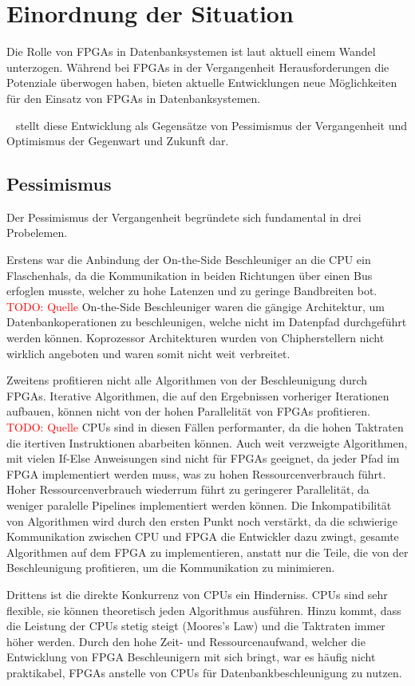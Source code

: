\documentclass[conference]{IEEEtran}
\newcommand{\todo}[1]{\textcolor{red}{TODO: #1}}
\begin{document}
\section{Einordnung der Situation}
Die Rolle von FPGAs in Datenbanksystemen ist laut \cite{istvan_glass_2019} aktuell einem Wandel unterzogen. Während bei FPGAs in der Vergangenheit
Herausforderungen die Potenziale überwogen haben, bieten aktuelle Entwicklungen neue Möglichkeiten für den Einsatz von FPGAs in Datenbanksystemen.

~\cite{istvan_glass_2019} stellt diese Entwicklung als Gegensätze von Pessimismus der Vergangenheit und Optimismus der Gegenwart und Zukunft dar.

\subsection{Pessimismus}
Der Pessimismus der Vergangenheit begründete sich fundamental in drei Probelemen.

Erstens war die Anbindung der On-the-Side Beschleuniger an die CPU ein Flaschenhals, da die Kommunikation in beiden Richtungen über
einen Bus erfoglen musste, welcher zu hohe Latenzen und zu geringe Bandbreiten bot. \todo{Quelle} On-the-Side Beschleuniger waren
die gängige Architektur, um Datenbankoperationen zu beschleunigen, welche nicht im Datenpfad durchgeführt werden können.
Koprozessor Architekturen wurden von Chipherstellern nicht wirklich angeboten und waren somit nicht weit verbreitet.

Zweitens profitieren nicht alle Algorithmen von der Beschleunigung durch FPGAs. Iterative Algorithmen, die auf den Ergebnissen vorheriger
Iterationen aufbauen, können nicht von der hohen Parallelität von FPGAs profitieren. \todo{Quelle} CPUs sind in diesen Fällen performanter,
da die hohen Taktraten die itertiven Instruktionen abarbeiten können. Auch weit verzweigte Algorithmen, mit vielen If-Else Anweisungen
sind nicht für FPGAs geeignet, da jeder Pfad im FPGA implementiert werden muss, was zu hohen Ressourcenverbrauch führt. Hoher Ressourcenverbrauch
wiederrum führt zu geringerer Parallelität, da weniger paralelle Pipelines implementiert werden können. Die Inkompatibilität von Algorithmen
wird durch den ersten Punkt noch verstärkt, da die schwierige Kommunikation zwischen CPU und FPGA die Entwickler dazu zwingt, gesamte Algorithmen
auf dem FPGA zu implementieren, anstatt nur die Teile, die von der Beschleunigung profitieren, um die Kommunikation zu minimieren.

Drittens ist die direkte Konkurrenz von CPUs ein Hinderniss. CPUs sind sehr flexible, sie können theoretisch jeden Algorithmus
ausführen. Hinzu kommt, dass die Leistung der CPUs stetig steigt (Moores's Law) und die Taktraten immer höher werden. Durch den hohe
Zeit- und Ressourcenaufwand, welcher die Entwicklung von FPGA Beschleunigern mit sich bringt, war es häufig nicht praktikabel, FPGAs
anstelle von CPUs für Datenbankbeschleunigung zu nutzen.
\end{document}
